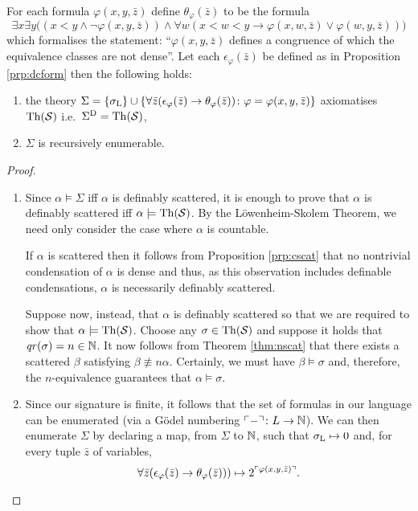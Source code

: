 \begin{prp}\label{prp:rescat}
	For each formula $\varphi(x,y,\bar{z})$ define $\theta_\varphi(\bar{z})$ to be the formula
	\begin{equation}
		\exists x\exists y\big((x<y\wedge\neg\varphi(x,y,\bar{z}))\wedge\forall
		w(x<w<y\rightarrow\varphi(x,w,\bar{z})\vee\varphi(w,y,\bar{z}))\big)
	\end{equation}
	which formalises the statement: ``$\varphi(x,y,\bar{z})$ defines a
	congruence of which the equivalence classes are not dense''.  Let each
	$\epsilon_\varphi(\bar{z})$ be defined as in Proposition \ref{prp:dcform}
	then the following holds:
	\begin{enumerate}
		\item the theory
			$\Sigma=\left\lbrace \sigma_{\mathrm{L}}\right\rbrace\cup\left\lbrace \forall\bar{z}(\epsilon_\varphi(\bar{z})
			\rightarrow\theta_\varphi(\bar{z}))\colon \varphi=\varphi(x,y,\bar{z}) \right\rbrace$
			axiomatises $\operatorname{Th}(\mathcal{S})$ i.e.\ ${\Sigma}^\mathrm{D}=\operatorname{Th}(\mathcal{S})$,

		\item $\Sigma$ is recursively enumerable.
	\end{enumerate}
	\begin{proof}
		\begin{enumerate}
			\item	Since $\alpha\models\Sigma$ iff $\alpha$ is definably
				scattered, it is enough to prove that $\alpha$ is definably
				scattered iff $\alpha\models\operatorname{Th}(\mathcal{S})$.  By the
				L\"owenheim-Skolem Theorem, we need only consider the case where
				$\alpha$ is countable.

				If $\alpha$ is scattered then it follows from Proposition
				\ref{prp:cscat} that no nontrivial condensation of $\alpha$ is
				dense and thus, as this observation includes definable
				condensations, $\alpha$ is necessarily definably scattered.

				Suppose now, instead, that $\alpha$ is definably scattered so
				that we are required to show that
				$\alpha\models\operatorname{Th}(\mathcal{S})$.  Choose any
				$\sigma\in\operatorname{Th}(\mathcal{S})$ and suppose it holds that
				$\mathit{qr}(\sigma)=n\in\mathbb{N}$.  It now follows from Theorem
				\ref{thm:nscat} that there exists a scattered $\beta$ satisfying
				$\beta\nequiv{n}\alpha$.  Certainly, we must have
				$\beta\models\sigma$ and, therefore, the $n$-equivalence
				guarantees that $\alpha\models\sigma$.

			\item	Since our signature is finite, it follows that the set of
				formulas in our language can be enumerated (via a G\"odel
				numbering $\ulcorner -\urcorner\colon L\to\mathbb{N}$).  We can then enumerate
				$\Sigma$ by declaring a map, from $\Sigma$ to $\mathbb{N}$, such that
				$\sigma_{\mathrm{L}}\mapsto 0$ and, for every tuple $\bar{z}$ of variables,
				\begin{equation}
					\forall
					\bar{z}(\epsilon_\varphi(\bar{z})\rightarrow\theta_\varphi(\bar{z})))\mapsto
					2^{\ulcorner \varphi(x,y,\bar{z})\urcorner}.\label{eq:regod}
				\end{equation}


\end{enumerate}
\end{proof}
\end{prp}
